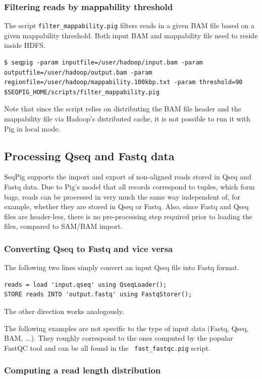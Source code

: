 \subsubsection{Filtering reads by mappability threshold}
The script {\tt filter\_mappability.pig} filters reads in a given BAM file based on a given
mappability threshold. Both input BAM and mappability file need to reside inside HDFS.
\begin{lstlisting}
$ seqpig -param inputfile=/user/hadoop/input.bam -param outputfile=/user/hadoop/output.bam -param regionfile=/user/hadoop/mappability.100kbp.txt -param threshold=90 $SEQPIG_HOME/scripts/filter_mappability.pig
\end{lstlisting}
Note that since the script relies on distributing the BAM file header and the
mappability file via Hadoop's distributed cache, it is not possible to run it
with Pig in local mode.

\subsection{Processing Qseq and Fastq data}

SeqPig supports the import and export of non-aligned reads stored in
Qseq and Fastq data. Due to Pig's model that all records correspond to
tuples, which form bags, reads can be processed in very much the same
way independent of, for example, whether they are stored in Qseq or
Fastq. Also, since Fastq and Qseq files are header-less, there is no
pre-processing step required prior to loading the files, compared to
SAM/BAM import.

\subsubsection{Converting Qseq to Fastq and vice versa}

The following two lines simply convert an input Qseq file into Fastq format.
\begin{lstlisting}
reads = load 'input.qseq' using QseqLoader();
STORE reads INTO 'output.fastq' using FastqStorer(); 
\end{lstlisting}
The other direction works analogously.

The following examples are not specific to the type of input data
(Fastq, Qseq, BAM, $\ldots$). They roughly correspond to the ones
computed by the popular FastQC tool and can be all found in the {\tt
  fast\_fastqc.pig} script.

\subsubsection{Computing a read length distribution}
\label{sect:read_length_dist}


